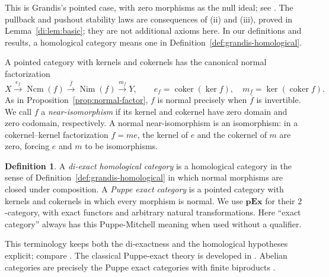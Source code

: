 \documentclass[11pt,reqno,a4paper]{amsart}
\theoremstyle{definition}
\newtheorem{definition}[theorem]{Definition}
\theoremstyle{remark}
\newcommand{\0}{\mathbf{0}}
\renewcommand{\1}{\mathbf{1}}
\newcommand{\pExact}{\mathbf{pEx}}
\newcommand{\Nim}{\operatorname{Nim}}
\newcommand{\Ncm}{\operatorname{Ncm}}
\begin{document}
This is Grandis's pointed case, with zero morphisms as the null
ideal; see \cite[Sections~1.3 and~1.6]{Grandis92}.
The pullback and pushout stability laws are consequences of
\textup{(ii)} and \textup{(iii)}, proved in
Lemma~\ref{di:lem:basic}; they are not additional axioms here.
In our definitions and results, a homological category means one in
Definition~\ref{def:grandis-homological}.

A pointed category with kernels and cokernels has the canonical normal
factorization
\[
 X\xrightarrow{e_f}\Ncm(f)\xrightarrow{\overline f}\Nim(f)
 \xrightarrow{m_f}Y,
 \qquad e_f=\operatorname{coker}(\ker f),\quad
 m_f=\ker(\operatorname{coker}f).
\]
As in Proposition~\ref{prop:normal-factor}, $f$ is normal precisely when
$\overline f$ is invertible. We call $f$ a \emph{near-isomorphism} if
its kernel and cokernel have zero domain and zero codomain, respectively.
A normal near-isomorphism is an isomorphism: in a cokernel--kernel factorization
$f=me$, the kernel of $e$ and the cokernel of $m$ are zero, forcing
$e$ and $m$ to be isomorphisms.

\begin{definition}
A \emph{di-exact homological category} is a homological category
in the sense of Definition~\ref{def:grandis-homological} in which
normal morphisms are closed under composition.
A \emph{Puppe exact category} is a pointed category with kernels and
cokernels in which every morphism is normal. We use $\pExact$ for their
$2$-category, with exact functors and arbitrary natural transformations.
Here ``exact category'' always has this Puppe-Mitchell meaning when
used without a qualifier.
\end{definition}

This terminology keeps both the di-exactness and the homological
hypotheses explicit; compare \cite{Afsa,PeschkeLinden,Grandis13}.
The classical Puppe-exact theory is developed in
\cite{Pup62,Mit65,BP69}. Abelian categories are precisely the
Puppe exact categories with finite biproducts
\cite{Mit65,BP69}.
\end{document}
